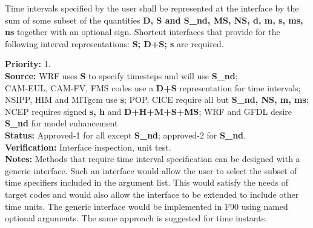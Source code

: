

\label{req:tp_tv}

\label{req:spec-tint}
Time intervals specified by the user shall be represented at the interface by the 
sum of some subset of the quantities {\bf D, S and S\_nd, MS, NS, d, m, s, ms, ns}
together with an optional sign.  Shortcut interfaces that provide for the following 
interval representations: {\bf S; D+S; s} are required.  

\begin{reqlist}
{\bf Priority:} 1. \\
{\bf Source:} WRF uses {\bf S} to specify timesteps and will use {\bf S\_nd}; \\
CAM-EUL, CAM-FV, FMS codes use a {\bf D+S} representation for time intervals; 
NSIPP, HIM and MITgcm use {\bf s}; 
POP, CICE require all but {\bf S\_nd, NS, m, ms};
NCEP requires signed {\bf s, h} and {\bf D+H+M+S+MS};
WRF and GFDL desire {\bf S\_nd} for model enhancement \\
{\bf Status:} Approved-1 for all except {\bf S\_nd}; 
approved-2 for {\bf S\_nd}.\\
{\bf Verification:} Interface inspection, unit test. \\
{\bf Notes:} Methods that require time interval specification can be designed with 
a generic interface.  Such an interface would allow the user to select the subset of
time specifiers included in the argument list.  This would satisfy the needs of 
target codes and would also allow the interface to be extended to include other 
time units.  The generic interface would be implemented in F90 using named optional 
arguments.  The same approach is suggested for time instants. 
\end{reqlist}

